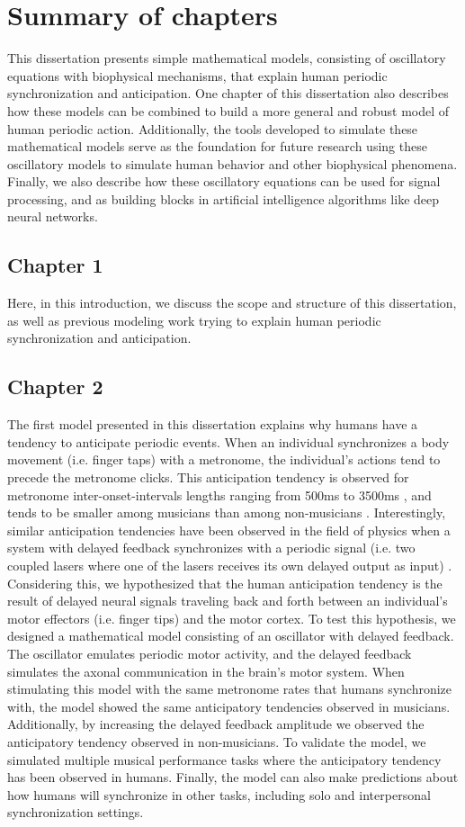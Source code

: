 \documentclass{report}
\begin{document}
\section{Summary of chapters}
This dissertation presents simple mathematical models, consisting of oscillatory equations with biophysical mechanisms, that explain human periodic synchronization and anticipation. One chapter of this dissertation also describes how these models can be combined to build a more general and robust model of human periodic action. Additionally, the tools developed to simulate these mathematical models serve as the foundation for future research using these oscillatory models to simulate human behavior and other biophysical phenomena. Finally, we also describe how these oscillatory equations can be used for signal processing, and as building blocks in artificial intelligence algorithms like deep neural networks.

\subsection{Chapter 1}
Here, in this introduction, we discuss the scope and structure of this dissertation, as well as previous modeling work trying to explain human periodic synchronization and anticipation.

\subsection{Chapter 2}
The first model presented in this dissertation explains why humans have a tendency to anticipate periodic events. When an individual synchronizes a body movement (i.e. finger taps) with a metronome, the individual’s actions tend to precede the metronome clicks. This anticipation tendency is observed for metronome inter-onset-intervals lengths ranging from 500ms to 3500ms \cite{repp2005sensorimotor}, and tends to be smaller among musicians than among non-musicians \cite{repp2007tapping}. Interestingly, similar anticipation tendencies have been observed in the field of physics when a system with delayed feedback synchronizes with a periodic signal (i.e. two coupled lasers where one of the lasers receives its own delayed output as input) \cite{stepp2010strong}. Considering this, we hypothesized that the human anticipation tendency is the result of delayed neural signals traveling back and forth between an individual’s motor effectors (i.e. finger tips) and the motor cortex. To test this hypothesis, we designed a mathematical model consisting of an oscillator with delayed feedback. The oscillator emulates periodic motor activity, and the delayed feedback simulates the axonal communication in the brain’s motor system. When stimulating this model with the same metronome rates that humans synchronize with, the model showed the same anticipatory tendencies observed in musicians. Additionally, by increasing the delayed feedback amplitude we observed the anticipatory tendency observed in non-musicians. To validate the model, we simulated multiple musical performance tasks where the anticipatory tendency has been observed in humans. Finally, the model can also make predictions about how humans will synchronize in other tasks, including solo and interpersonal synchronization settings.
\end{document}

